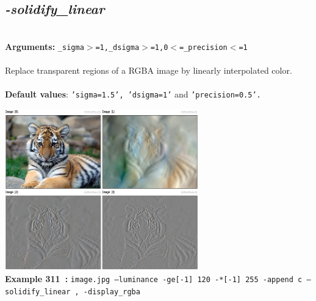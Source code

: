 \documentclass[a4paper,11pt,twoside]{book}
\begin{document}
\subsection{\emph{-solidify\_linear} }\vspace*{-0.5em}
~\\\textbf{Arguments: } 
{\small \texttt{\_sigma$>$=1,\_dsigma$>$=1,0$<$=\_precision$<$=1}}\\~\\
Replace transparent regions of a RGBA image by linearly interpolated color.
~\\~\\\textbf{Default values}: {\small \texttt{'sigma=1.5', 'dsigma=1'} and \texttt{'precision=0.5'.}}
\begin{center}\includegraphics[keepaspectratio=true,height=7cm,width=\textwidth]{img/gmic_def311.jpg}\\
{\footnotesize \textbf{Example 311~:} \texttt{image.jpg --luminance -ge[-1] 120 -*[-1] 255 -append c --solidify\_linear , -display\_rgba}}
\end{center}
\end{document}
